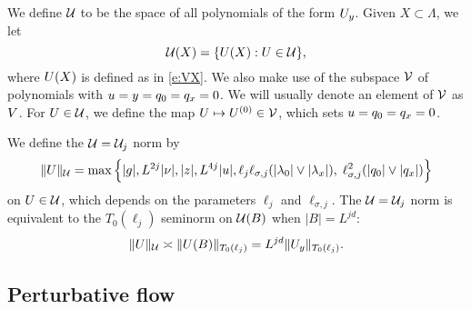 We define $\mathcal{U}$ to be the space of all polynomials of the form $U_y$.
Given $X \subset \Lambda$, we let
\begin{equation}
\label{e:Vcalesig}
\mathcal{U}(X) = \{U(X) : U \in \mathcal{U} \},
\end{equation}
where $U(X)$ is defined as in \eqref{e:VX}.
We also make use of the %
subspace $\mathcal{V}$ of polynomials with
$u = y = q_0=q_x = 0$.
We will usually denote an element of $\mathcal{V}$ as $V$.
For $U \in \mathcal{U}$, we define %
the map $U \mapsto U^{(0)} \in \mathcal{V}$, which sets
$u = q_0 = q_x = 0$.

We define the $\mathcal{U} = \mathcal{U}_j$ norm by
\begin{equation}
\label{e:Vnormdef}
\|U\|_{\mathcal{U}}
	=
\max
\Big\{
	|g|, L^{2j}|\nu|, |z|, L^{4j}|u|,
	\ell_j\ell_{\sigma,j}(|\lambda_0|\vee|\lambda_x|), \;
	\ell_{\sigma,j}^{2} (|q_0|\vee|q_x|)
\Big\}
\end{equation}
on $U \in \mathcal{U}$, which depends on the parameters $\ell_j$ and $\ell_{\sigma,j}$.
The $\mathcal{U} = \mathcal{U}_j$ norm is equivalent to the $T_0(\ell_j)$ seminorm on $\mathcal{U}(B)$
when $|B| = L^{jd}$:
\begin{equation}
\|U\|_{\mathcal{U}} \asymp \|U(B)\|_{T_0(\ell_j)} = L^{jd} \|U_y\|_{T_0(\ell_j)}.
\end{equation}


\subsection{Perturbative flow}
\label{sec:pt}

